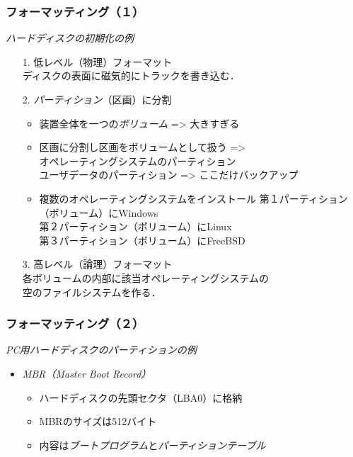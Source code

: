 \documentclass[unicode]{beamer}                   %
\begin{document}
\begin{frame}
  \frametitle{フォーマッティング（１）}
  \emph{ハードディスクの初期化の例}
  \begin{itemize}
    \item[1.] 低レベル（物理）フォーマット \\
      ディスクの表面に磁気的にトラックを書き込む．
    \item[2.] \emph{パーティション}（区画）に分割 \\
      \begin{itemize}
      \item 装置全体を一つの\emph{ボリューム} => 大きすぎる
      \item 区画に分割し区画をボリュームとして扱う => \\
        オペレーティングシステムのパーティション \\
        ユーザデータのパーティション => ここだけバックアップ
      \item 複数のオペレーティングシステムをインストール
        第１パーティション（ボリューム）にWindows \\
        第２パーティション（ボリューム）にLinux \\
        第３パーティション（ボリューム）にFreeBSD
      \end{itemize}
    \item[3.] 高レベル（論理）フォーマット \\
      各ボリュームの内部に該当オペレーティングシステムの \\
      空のファイルシステムを作る．
  \end{itemize}
\end{frame}

\begin{frame}
  \frametitle{フォーマッティング（２）}
  \emph{PC用ハードディスクのパーティションの例}
  \begin{itemize}
  \item \emph{MBR（Master Boot Record）} \\
    \begin{itemize}
    \item ハードディスクの先頭セクタ（LBA0）に格納
    \item MBRのサイズは512バイト
    \item 内容は\emph{ブートプログラム}と\emph{パーティションテーブル}
    \end{itemize}
  \end{itemize}
\end{frame}
\end{document}
